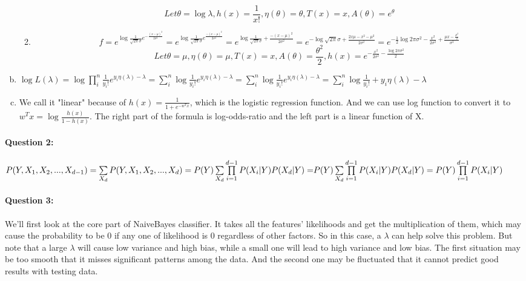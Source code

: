 \documentclass[letterpaper,11pt]{article}
\begin{document}
\begin{enumerate}[(a)]
\begin{enumerate}[(1)]
{\begin{equation}
Let \theta=\log{}{\lambda},h(x)=\frac{1}{x!},\eta(\theta)=\theta,T(x)=x,A(\theta)=e^{\theta}
\end{equation}
}
\item{
\begin{dmath}
f=e^{\log{}{\frac{1}{\sqrt{2\pi}\sigma}}e^{-\frac{{(x-\mu)}^2}{2\sigma^2}}}=e^{\log{}{\frac{1}{\sqrt{2\pi}\sigma}e^{\frac{-(x-\mu)^2}{2\sigma^2}}}}=e^{\log{}{\frac{1}{\sqrt{2\pi}\sigma}}+\frac{-(x-\mu)^2}{2\sigma^2}}=e^{-\log{}{\sqrt{2\pi}\sigma}+\frac{2x\mu-x^2-\mu^2}{2\sigma^2}}=e^{-\frac{1}{2}\log{}{2\pi\sigma^2}-\frac{x^2}{2\sigma^2}+\frac{\mu x-\frac{\mu^2}{2}}{\sigma^2}}
\end{dmath}
\begin{equation}
Let \theta=\mu,\eta(\theta)=\mu,T(x)=x,A(\theta)=\frac{\theta^2}{2},h(x)=e^{-\frac{x^2}{2\sigma^2}-\frac{\log{}{2\pi\sigma^2}}{2}}
\end{equation}
}
\end{enumerate}
\item
$\log{}{L(\lambda)}=\log{}{\prod_i^n}\frac{1}{y_{i}!}e^{y_{i}\eta(\lambda)-\lambda}=\sum_i^n\log{}{\frac{1}{y_{i}!}}e^{y_{i}\eta(\lambda)-\lambda}=\sum_i^n\log{}{\frac{1}{y_{i}!}e^{y_{i}\eta(\lambda)-\lambda}}=\sum_i^n\log{}{\frac{1}{y_{i}!}+y_{i}\eta(\lambda)-\lambda}$
\item
We call it "linear" because of $h(x)=\frac{1}{1+e^{-w^{T}x}}$, which is the logistic regression function. And we can use log function to convert it to $w^{T}x=\log{}{\frac{h(x)}{1-h(x)}}$. The right part of the formula is log-odds-ratio and the left part is a linear function of X.
\end{enumerate}

\paragraph{Question 2:}

$P(Y,{X_1},{X_2},...,{X_{d - 1}}) = \sum\limits_{{X_d}} {P(Y,{X_1},{X_2},...,{X_d})}  = P(Y)\sum\limits_{{X_d}} {\prod\limits_{i = 1}^{d - 1} {P({X_i}|Y)} P({X_d}|Y) = } \\
P(Y)\sum\limits_{{X_d}} {\prod\limits_{i = 1}^{d - 1} {P({X_i}|Y)} } P({X_d}|Y)  = P(Y)\prod\limits_{i = 1}^{d - 1} {P({X_i}|Y)}$


\paragraph{Question 3:}
We'll first look at the core part of NaiveBayes classifier. It takes all the features' likelihoods and get the multiplication of them, which may cause the probability to be 0 if any one of likelihood is 0 regardless of other factors. So in this case, a $\lambda$ can help solve this problem. But note that a large $\lambda$ will cause low variance and high bias, while a small one will lead to high variance and low bias. The first situation may be too smooth that it misses significant patterns among the data. And the second one may be fluctuated that it cannot predict good results with testing data.
\end{document}
